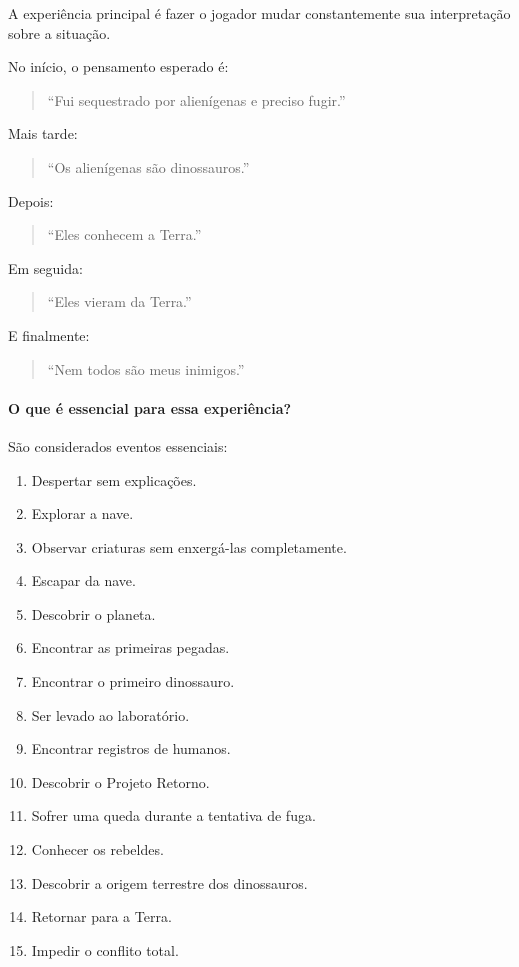\documentclass[12pt,a4paper]{article}
\begin{document}
A experiência principal é fazer o jogador mudar constantemente sua
interpretação sobre a situação.

No início, o pensamento esperado é:

\begin{quote}
``Fui sequestrado por alienígenas e preciso fugir.''
\end{quote}

Mais tarde:

\begin{quote}
``Os alienígenas são dinossauros.''
\end{quote}

Depois:

\begin{quote}
``Eles conhecem a Terra.''
\end{quote}

Em seguida:

\begin{quote}
``Eles vieram da Terra.''
\end{quote}

E finalmente:

\begin{quote}
``Nem todos são meus inimigos.''
\end{quote}

\paragraph{O que é essencial para essa experiência?}

São considerados eventos essenciais:

\begin{enumerate}
    \item Despertar sem explicações.
    \item Explorar a nave.
    \item Observar criaturas sem enxergá-las completamente.
    \item Escapar da nave.
    \item Descobrir o planeta.
    \item Encontrar as primeiras pegadas.
    \item Encontrar o primeiro dinossauro.
    \item Ser levado ao laboratório.
    \item Encontrar registros de humanos.
    \item Descobrir o Projeto Retorno.
    \item Sofrer uma queda durante a tentativa de fuga.
    \item Conhecer os rebeldes.
    \item Descobrir a origem terrestre dos dinossauros.
    \item Retornar para a Terra.
    \item Impedir o conflito total.
\end{enumerate}
\end{document}
